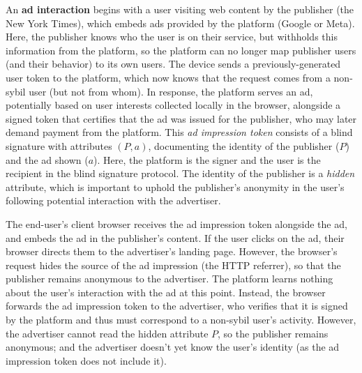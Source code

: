 %
An \textbf{ad interaction} begins with a user visiting web content by the publisher (\eg the New York Times), which embeds ads provided by the platform (\eg Google or Meta).
%
Here, the publisher knows who the user is on their service, but withholds this information from the platform, so the platform can no longer map publisher users (and their behavior) to its own users.
%
The device sends a previously-generated user token to the platform, which now knows that the request comes from a non-sybil user (but not from whom).
%
In response, the platform serves an ad, potentially based on user interests collected locally in the browser, alongside a signed token that certifies that the ad was issued for the publisher, who may later demand payment from the platform.
%
This \emph{ad impression token} consists of a blind signature with attributes $(P, a)$, documenting the identity of the publisher ($P$) and the ad shown ($a$).
%
Here, the platform is the signer and the user is the recipient in the blind signature protocol.
%
The identity of the publisher is a \emph{hidden} attribute, which is important to uphold the publisher's anonymity in the user's following potential interaction with the advertiser.
%

%
The end-user's client browser receives the ad impression token alongside the ad, and embeds the ad in the publisher's content.
%
If the user clicks on the ad, their browser directs them to the advertiser's landing page.
%
However, the browser's request hides the source of the ad impression (\eg the HTTP referrer), so that the publisher remains anonymous to the advertiser.
%
The platform learns nothing about the user's interaction with the ad at this point.
%
Instead, the browser forwards the ad impression token to the advertiser, who verifies that it is signed by the platform and thus must correspond to a non-sybil user's activity.
%
However, the advertiser cannot read the hidden attribute $P$, so the publisher remains anonymous; and the advertiser doesn't yet know the user's identity (as the ad impression token does not include it).
%

